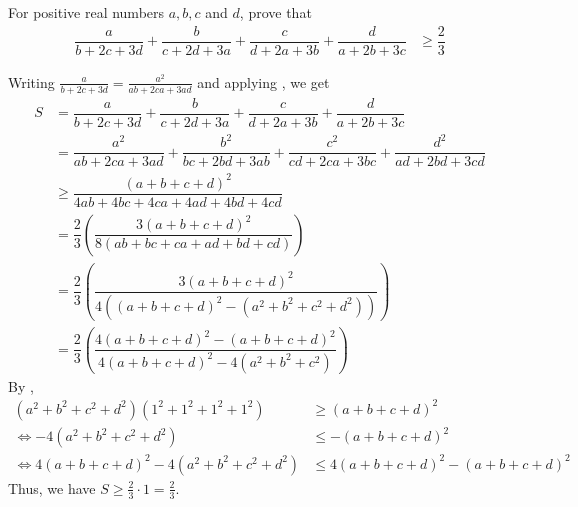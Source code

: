 \documentclass{subfile}
\begin{document}
		\begin{problem}
			For positive real numbers $a,b,c$ and $d$, prove that
				\begin{align*}
					\dfrac{a}{b+2c+3d}+\dfrac{b}{c+2d+3a}+\dfrac{c}{d+2a+3b}+\dfrac{d}{a+2b+3c}
						& \geq \dfrac{2}{3}
				\end{align*}

				\begin{solution}
					Writing $\frac{a}{b+2c+3d}=\frac{a^{2}}{ab+2ca+3ad}$ and applying , we get
						\begin{align*}
							S
								& = \dfrac{a}{b+2c+3d}+\dfrac{b}{c+2d+3a}+\dfrac{c}{d+2a+3b}+\dfrac{d}{a+2b+3c}\\
								& = \dfrac{a^{2}}{ab+2ca+3ad}+\dfrac{b^{2}}{bc+2bd+3ab}+\dfrac{c^{2}}{cd+2ca+3bc}+\dfrac{d^{2}}{ad+2bd+3cd}\\
								& \geq \dfrac{(a+b+c+d)^{2}}{4ab+4bc+4ca+4ad+4bd+4cd}\\
								& = \dfrac{2}{3}\left(\dfrac{3(a+b+c+d)^{2}}{8(ab+bc+ca+ad+bd+cd)}\right)\\
								& = \dfrac{2}{3}\left(\dfrac{3(a+b+c+d)^{2}}{4\left((a+b+c+d)^{2}-(a^{2}+b^{2}+c^{2}+d^{2})\right)}\right)\\
								& = \dfrac{2}{3}\left(\dfrac{4(a+b+c+d)^{2}-(a+b+c+d)^{2}}{4(a+b+c+d)^{2}-4(a^{2}+b^{2}+c^{2})}\right)
						\end{align*}
					By ,
						\begin{align*}
							(a^{2}+b^{2}+c^{2}+d^{2})(1^{2}+1^{2}+1^{2}+1^{2})
								& \geq (a+b+c+d)^{2}\\
							\iff -4(a^{2}+b^{2}+c^{2}+d^{2})
								& \leq -(a+b+c+d)^{2}\\
							\iff 4(a+b+c+d)^{2}-4(a^{2}+b^{2}+c^{2}+d^{2})
								& \leq 4(a+b+c+d)^{2}-(a+b+c+d)^{2}
						\end{align*}
					Thus, we have $S\geq \frac{2}{3}\cdot1=\frac{2}{3}$.
				\end{solution}
		\end{problem}
\end{document}
